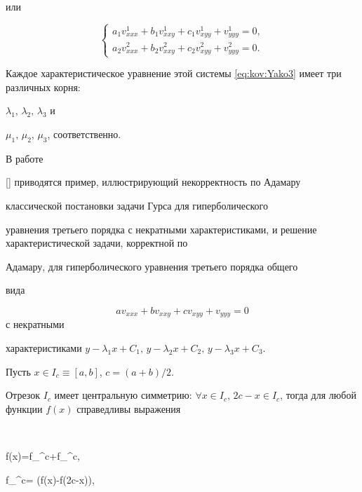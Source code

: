 или

$$

\left\{ \begin{array}{ll}

a_{1}v^{1}_{xxx}+b_{1}v^{1}_{xxy}+c_{1}v^{1}_{xyy}+v^{1}_{yyy}=0, \\

a_{2}v^{2}_{xxx}+b_{2}v^{2}_{xxy}+c_{2}v^{2}_{xyy}+v^{2}_{yyy}=0.

\end{array} \right.

$$

Каждое характеристическое уравнение этой системы \eqref{eq:kov:Yako3} имеет три различных корня:

$\lambda_{1},\,\lambda_{2},\,\lambda_{3}$ и

$\mu_{1},\,\mu_{2},\,\mu_{3}$, соответственно.



\smallskip



 В работе

[] приводятся пример, иллюстрирующий некорректность по Адамару

классической постановки задачи Гурса для гиперболического

уравнения третьего порядка с некратными характеристиками, и решение характеристической задачи, корректной по

Адамару, для гиперболического уравнения третьего порядка общего

вида

$$av_{xxx}+bv_{xxy}+cv_{xyy}+v_{yyy}=0$$ с некратными

характеристиками $y-\lambda_{1}x+C_{1},\, y-\lambda_{2}x+C_{2}, \,

y-\lambda_{3}x+C_{3}$.



\pagebreak



Пусть $x\in I_{c}\equiv [a, b]$, $c=({a+b})/{2}$. 

Отрезок $I_{c}$ имеет центральную симметрию: $\forall x\in I_{c},\, 2c-x

\in I_{c}$, тогда для любой функции $f(x)$ справедливы выражения

$$

f(x)=f_{{}}^{c}+f_{{}}^{c},\quad 

f_{{}}^{c}=  ({f(x)-f(2c-x)}),\quad 


